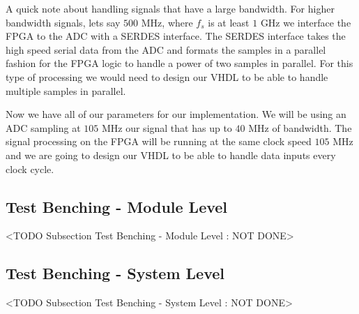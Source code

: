 A quick note about handling signals that have a large bandwidth. For higher bandwidth signals, lets say $500$ \ac{MHz}, where $f_s$ is at least $1$ \ac{GHz} we interface the \ac{FPGA} to the \ac{ADC} with a \ac{SERDES} interface. The \ac{SERDES} interface takes the high speed serial data from the \ac{ADC} and formats the samples in a parallel fashion for the \ac{FPGA} logic to handle a power of two samples in parallel. For this type of processing we would need to design our \ac{VHDL} to be able to handle multiple samples in parallel.

Now we have all of our parameters for our implementation. We will be using an \ac{ADC} sampling at $105$ \ac{MHz} our signal that has up to $40$ \ac{MHz} of bandwidth. The signal processing on the \ac{FPGA} will be running at the same clock speed $105$ \ac{MHz} and we are going to design our \ac{VHDL} to be able to handle data inputs every clock cycle.

\subsection{Test Benching - Module Level}
	<TODO Subsection Test Benching - Module Level : NOT DONE>

\subsection{Test Benching - System Level}
	<TODO Subsection Test Benching - System Level : NOT DONE>
